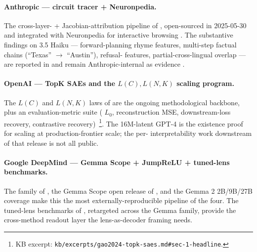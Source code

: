 \paragraph{Anthropic --- circuit tracer + Neuronpedia.}
The cross-layer- + Jacobian-attribution pipeline of
\citet{lindsey2025-circuit-tracing}, open-sourced in 2025-05-30 and
integrated with Neuronpedia for interactive  browsing
. The substantive findings on 
3.5 Haiku --- forward-planning rhyme features, multi-step factual
chains (``Texas'' $\to$ ``Austin''), refusal- features,
partial-cross-lingual  overlap --- are reported in
\citet{lindsey2025-biology} and remain Anthropic-internal as evidence
.

\paragraph{OpenAI --- TopK SAEs and the $L(C), L(N, K)$ scaling
program.}
The $L(C)$ and $L(N, K)$ laws of \citet{gao2024-topk-saes} are the
ongoing methodological backbone, plus an evaluation-metric suite (
$L_0$, reconstruction MSE, downstream-loss recovery, contrastive 
recovery)~\citep[\S 1 contributions]{gao2024-topk-saes}\footnote{KB
excerpt: \nolinkurl{kb/excerpts/gao2024-topk-saes.md#sec-1-headline}.}.
The 16M-latent GPT-4  is the existence proof for  scaling at
production-frontier scale; the per- interpretability work
downstream of that release is not all public.

\paragraph{Google DeepMind --- Gemma Scope + JumpReLU + tuned-lens
benchmarks.}
The  family of \citet{rajamanoharan2024-jumprelu}, the
Gemma Scope open release of \citet{gemma-scope-2024}, and the Gemma 2
2B/9B/27B coverage make this the most externally-reproducible pipeline
of the four. The tuned-lens benchmarks of
\citet{belrose2023-tuned-lens}, retargeted across the Gemma family,
provide the cross-method readout layer the lens-as-decoder framing
needs.

